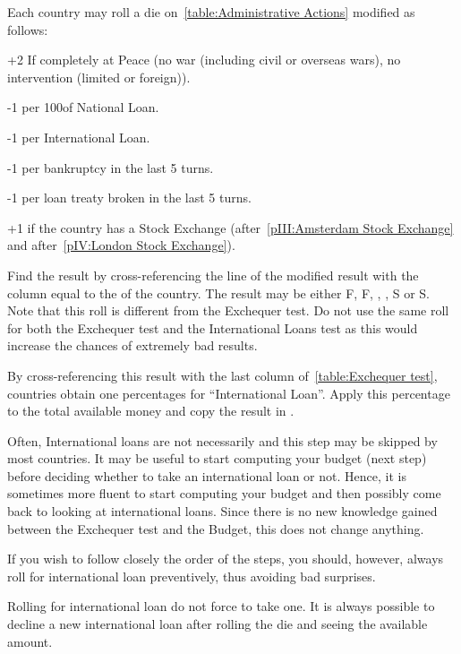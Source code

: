  Each country may roll a die
on~\ref{table:Administrative Actions} modified as follows:
\begin{modlist}
\item[+2] If completely at Peace (no war (including civil or overseas wars),
  no intervention (limited or foreign)).
\item[-1 ] per 100\ducats of National Loan.
\item[-1] per International Loan.
\item[-1 ] per bankruptcy in the last 5 turns.
\item[-1] per loan treaty broken in the last 5 turns.
\item[+1 ] if the country has a Stock Exchange (\HOL after~\ref{pIII:Amsterdam
    Stock Exchange} and \ANG after~\ref{pIV:London Stock Exchange}).
\end{modlist}
\bparag Find the result by cross-referencing the line of the modified result
with the column equal to the \STAB of the country.
\bparag The result may be either F\textetoile, F, \undemi, \undemi\textetoile,
S or S\textetoile.
\bparag Note that this roll is different from the Exchequer test. Do not use
the same roll for both the Exchequer test and the International Loans test as
this would increase the chances of extremely bad results.

 By cross-referencing this result with the last
column of~\ref{table:Exchequer test}, countries obtain one percentages for
``International Loan''.
\bparag Apply this percentage to the total available money and copy the result
in .

\begin{playtip}
  Often, International loans are not necessarily and this step may be skipped
  by most countries. It may be useful to start computing your budget (next
  step) before deciding whether to take an international loan or not. Hence,
  it is sometimes more fluent to start computing your budget and then possibly
  come back to looking at international loans. Since there is no new knowledge
  gained between the Exchequer test and the Budget, this does not change
  anything.

  If you wish to follow closely the order of the steps, you should, however,
  always roll for international loan preventively, thus avoiding bad
  surprises.

  Rolling for international loan do not force to take one. It is always
  possible to decline a new international loan after rolling the die and
  seeing the available amount.
\end{playtip}

